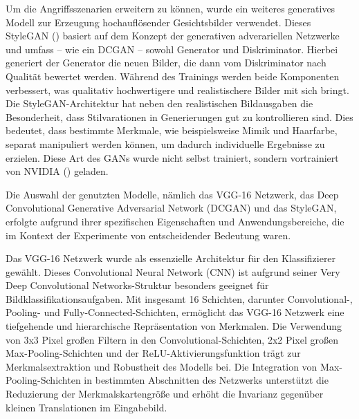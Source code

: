 Um die Angriffsszenarien erweitern zu können, wurde ein weiteres generatives Modell zur Erzeugung hochauflösender Gesichtsbilder verwendet. Dieses StyleGAN (\cite{karras_style-based_2019}) basiert auf dem Konzept der generativen adverariellen Netzwerke und umfass -- wie ein DCGAN -- sowohl Generator und Diskriminator. Hierbei generiert der Generator die neuen Bilder, die dann vom Diskriminator nach Qualität bewertet werden. Während des Trainings werden beide Komponenten verbessert, was qualitativ hochwertigere und realistischere Bilder mit sich bringt. Die StyleGAN-Architektur hat neben den realistischen Bildausgaben die Besonderheit, dass Stilvarationen in Generierungen gut zu kontrollieren sind. Dies bedeutet, dass bestimmte Merkmale, wie beispielsweise Mimik und Haarfarbe, separat manipuliert werden können, um dadurch individuelle Ergebnisse zu erzielen. Diese Art des GANs wurde nicht selbst trainiert, sondern vortrainiert von NVIDIA (\cite{noauthor_nvlabsstylegan_2024}) geladen.

Die Auswahl der genutzten Modelle, nämlich das VGG-16 Netzwerk, das Deep Convolutional Generative Adversarial Network (DCGAN) und das StyleGAN, erfolgte aufgrund ihrer spezifischen Eigenschaften und Anwendungsbereiche, die im Kontext der Experimente von entscheidender Bedeutung waren.

Das VGG-16 Netzwerk wurde als essenzielle Architektur für den Klassifizierer gewählt. Dieses Convolutional Neural Network (CNN) ist aufgrund seiner \glqq Very Deep Convolutional Networks\grqq-Struktur besonders geeignet für Bildklassifikationsaufgaben. Mit insgesamt 16 Schichten, darunter Convolutional-, Pooling- und Fully-Connected-Schichten, ermöglicht das VGG-16 Netzwerk eine tiefgehende und hierarchische Repräsentation von Merkmalen. Die Verwendung von 3x3 Pixel großen Filtern in den Convolutional-Schichten, 2x2 Pixel großen Max-Pooling-Schichten und der ReLU-Aktivierungsfunktion trägt zur Merkmalsextraktion und Robustheit des Modells bei. Die Integration von Max-Pooling-Schichten in bestimmten Abschnitten des Netzwerks unterstützt die Reduzierung der Merkmalskartengröße und erhöht die Invarianz gegenüber kleinen Translationen im Eingabebild.


